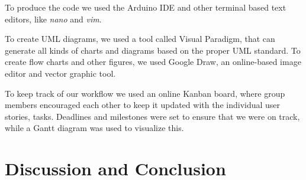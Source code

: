 To produce the code we used the Arduino IDE and other terminal based text editors, like \textit{nano} and \textit{vim}.

To create UML diagrams, we used a tool called Visual Paradigm, that can generate all kinds of charts and diagrams based on the proper UML standard. To create flow charts and other figures, we used Google Draw, an online-based image editor and vector graphic tool.

To keep track of our workflow we used an online Kanban board, where group members encouraged each other to keep it updated with the individual user stories, tasks. Deadlines and milestones were set to ensure that we were on track, while a Gantt diagram was used to visualize this.

\section{Discussion and Conclusion}
